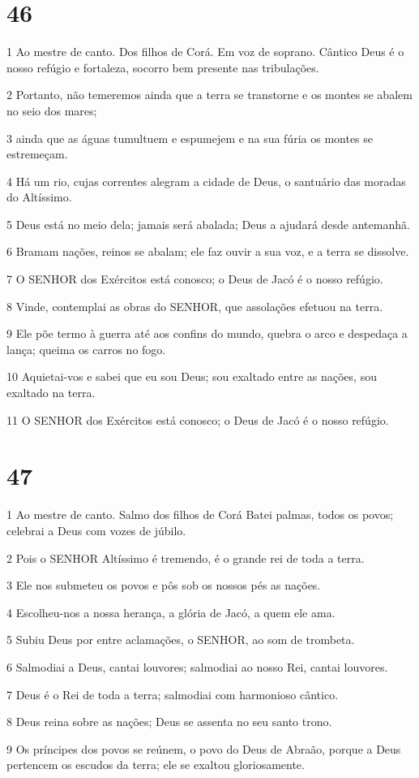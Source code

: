 \chapter{46}

\par 1 Ao mestre de canto. Dos filhos de Corá. Em voz de soprano. Cântico Deus é o nosso refúgio e fortaleza, socorro bem presente nas tribulações.
\par 2 Portanto, não temeremos ainda que a terra se transtorne e os montes se abalem no seio dos mares;
\par 3 ainda que as águas tumultuem e espumejem e na sua fúria os montes se estremeçam.
\par 4 Há um rio, cujas correntes alegram a cidade de Deus, o santuário das moradas do Altíssimo.
\par 5 Deus está no meio dela; jamais será abalada; Deus a ajudará desde antemanhã.
\par 6 Bramam nações, reinos se abalam; ele faz ouvir a sua voz, e a terra se dissolve.
\par 7 O SENHOR dos Exércitos está conosco; o Deus de Jacó é o nosso refúgio.
\par 8 Vinde, contemplai as obras do SENHOR, que assolações efetuou na terra.
\par 9 Ele põe termo à guerra até aos confins do mundo, quebra o arco e despedaça a lança; queima os carros no fogo.
\par 10 Aquietai-vos e sabei que eu sou Deus; sou exaltado entre as nações, sou exaltado na terra.
\par 11 O SENHOR dos Exércitos está conosco; o Deus de Jacó é o nosso refúgio.

\chapter{47}

\par 1 Ao mestre de canto. Salmo dos filhos de Corá Batei palmas, todos os povos; celebrai a Deus com vozes de júbilo.
\par 2 Pois o SENHOR Altíssimo é tremendo, é o grande rei de toda a terra.
\par 3 Ele nos submeteu os povos e pôs sob os nossos pés as nações.
\par 4 Escolheu-nos a nossa herança, a glória de Jacó, a quem ele ama.
\par 5 Subiu Deus por entre aclamações, o SENHOR, ao som de trombeta.
\par 6 Salmodiai a Deus, cantai louvores; salmodiai ao nosso Rei, cantai louvores.
\par 7 Deus é o Rei de toda a terra; salmodiai com harmonioso cântico.
\par 8 Deus reina sobre as nações; Deus se assenta no seu santo trono.
\par 9 Os príncipes dos povos se reúnem, o povo do Deus de Abraão, porque a Deus pertencem os escudos da terra; ele se exaltou gloriosamente.

